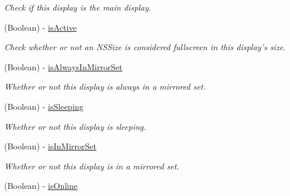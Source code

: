 \begin{DoxyCompactItemize}
\begin{DoxyCompactList}\small\item\em Check if this display is the main display. \item\end{DoxyCompactList}\item 
(Boolean) -\/ \hyperlink{interface_g_d_quartz_display_a39d3da702afebd2da2ede0eb04a62140}{isActive}
\begin{DoxyCompactList}\small\item\em Check whether or not an NSSize is considered fullscreen in this display's size. \item\end{DoxyCompactList}\item 
\hypertarget{interface_g_d_quartz_display_a56c59d1b9a59d561c17fad9e11aeb11b}{
(Boolean) -\/ \hyperlink{interface_g_d_quartz_display_a56c59d1b9a59d561c17fad9e11aeb11b}{isAlwaysInMirrorSet}}
\label{interface_g_d_quartz_display_a56c59d1b9a59d561c17fad9e11aeb11b}

\begin{DoxyCompactList}\small\item\em Whether or not this display is always in a mirrored set. \item\end{DoxyCompactList}\item 
\hypertarget{interface_g_d_quartz_display_aef3641e248198c71e9986da1cb95e4fd}{
(Boolean) -\/ \hyperlink{interface_g_d_quartz_display_aef3641e248198c71e9986da1cb95e4fd}{isSleeping}}
\label{interface_g_d_quartz_display_aef3641e248198c71e9986da1cb95e4fd}

\begin{DoxyCompactList}\small\item\em Whether or not this display is sleeping. \item\end{DoxyCompactList}\item 
\hypertarget{interface_g_d_quartz_display_a0d9416aa68b00e02a2f264e0d23b54b7}{
(Boolean) -\/ \hyperlink{interface_g_d_quartz_display_a0d9416aa68b00e02a2f264e0d23b54b7}{isInMirrorSet}}
\label{interface_g_d_quartz_display_a0d9416aa68b00e02a2f264e0d23b54b7}

\begin{DoxyCompactList}\small\item\em Whether or not this display is in a mirrored set. \item\end{DoxyCompactList}\item 
\hypertarget{interface_g_d_quartz_display_adc2198bd2eed56613fa482f801a15594}{
(Boolean) -\/ \hyperlink{interface_g_d_quartz_display_adc2198bd2eed56613fa482f801a15594}{isOnline}}
\label{interface_g_d_quartz_display_adc2198bd2eed56613fa482f801a15594}


\end{DoxyCompactItemize}
